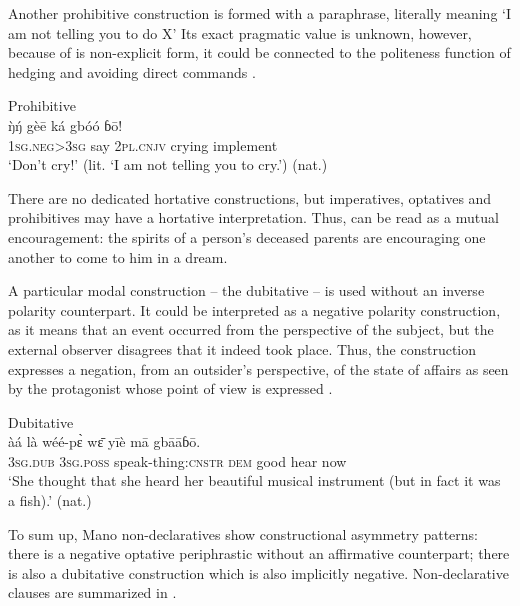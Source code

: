 \documentclass[output=paper,colorlinks,citecolor=brown]{langscibook}
\begin{document}
Another prohibitive construction is formed with a paraphrase, literally meaning ‘I am not telling you to do X’ Its exact pragmatic value is unknown, however, because of is non-explicit form, it could be connected to the politeness function of hedging and avoiding direct commands .

\ea\label{ex:mano:19}Prohibitive\\
    \gll \`{ŋ}\'{ŋ} gèē ká gbóó ɓō!\\
         1\textsc{sg.neg>3sg} say 2\textsc{pl.cnjv} crying implement    \\
    \glt ‘Don’t cry!’ (lit. ‘I am not telling you to cry.’) (nat.)
\z

There are no dedicated hortative constructions, but imperatives, optatives and prohibitives may have a hortative interpretation. Thus,  can be read as a mutual encouragement: the spirits of a person’s deceased parents are encouraging one another to come to him in a dream. 

A particular modal construction – the dubitative – is used without an inverse polarity counterpart. It could be interpreted as a negative polarity construction, as it means that an event occurred from the perspective of the subject, but the external observer disagrees that it indeed took place. Thus, the construction expresses a negation, from an outsider’s perspective, of the state of affairs as seen by the protagonist whose point of view is expressed . 

\ea\label{ex:mano:20}Dubitative\\
    \gll àá là wéé-pɛ̀ wɛ̄ yīè mā gbāāɓō.\\
     3\textsc{sg.dub} \textsc{3sg.poss} speak-thing:\textsc{cnstr} \textsc{dem} good hear now\\
    \glt ‘She thought that she heard her beautiful musical instrument (but in fact it was a fish).’ (nat.)
\z


To sum up, Mano non-declaratives show constructional asymmetry patterns: there is a negative optative periphrastic without an affirmative counterpart; there is also a dubitative construction which is also implicitly negative. Non-declarative clauses are summarized in . 


\begin{table}
\caption{Non-declarative clauses}
\label{tab:mano:2}
\end{table}
\end{document}
